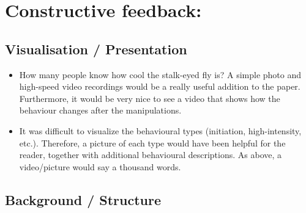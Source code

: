 \documentclass[10pt]{article}
\providecommand{\tightlist}{\setlength{\itemsep}{0pt}\setlength{\parskip}{0pt}}%
\begin{document}
\par\null

\section*{Constructive feedback:}

{\label{731764}}

\subsection*{Visualisation /
Presentation}

{\label{233033}}

\begin{itemize}
\tightlist
\item
  How many people know how cool the stalk-eyed fly is? A simple photo
  and high-speed video recordings would be a really useful addition to
  the paper. Furthermore, it would be very nice to see a video that
  shows how the behaviour changes after the manipulations.
\item
  It was difficult to visualize the behavioural types (initiation,
  high-intensity, etc.). Therefore, a picture of each type would have
  been helpful for the reader, together with additional behavioural
  descriptions. As above, a video/picture would say a thousand words.
\end{itemize}

\par\null

\subsection*{Background / Structure}

{\label{317172}}
\end{document}
